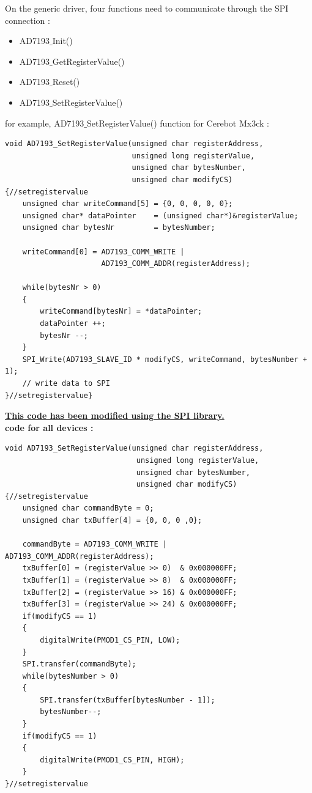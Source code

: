 \documentclass[10pt,a4paper]{report}
\begin{document}
On the generic driver, four functions need to communicate through the SPI connection :

\begin{itemize}
\item AD7193$\_$Init()
\item AD7193$\_$GetRegisterValue()
\item AD7193$\_$Reset()
\item AD7193$\_$SetRegisterValue()
\end{itemize}

 
 
for example, AD7193$\_$SetRegisterValue() function for Cerebot Mx3ck :




\begin{lstlisting}
void AD7193_SetRegisterValue(unsigned char registerAddress,
                             unsigned long registerValue,
                             unsigned char bytesNumber,
                             unsigned char modifyCS)
{//setregistervalue
    unsigned char writeCommand[5] = {0, 0, 0, 0, 0};
    unsigned char* dataPointer    = (unsigned char*)&registerValue;
    unsigned char bytesNr         = bytesNumber;

    writeCommand[0] = AD7193_COMM_WRITE |
                      AD7193_COMM_ADDR(registerAddress);
                   
    while(bytesNr > 0)
    {
        writeCommand[bytesNr] = *dataPointer;
        dataPointer ++;
        bytesNr --;
    }
    SPI_Write(AD7193_SLAVE_ID * modifyCS, writeCommand, bytesNumber + 1);
    // write data to SPI
}//setregistervalue}
\end{lstlisting}



\underline{\textbf{This code has been modified using the SPI library.}}\\

\textbf{code for all devices :} \\
\begin{lstlisting}
void AD7193_SetRegisterValue(unsigned char registerAddress,
                              unsigned long registerValue,
                              unsigned char bytesNumber,
                              unsigned char modifyCS)
{//setregistervalue
    unsigned char commandByte = 0;
    unsigned char txBuffer[4] = {0, 0, 0 ,0};
    
    commandByte = AD7193_COMM_WRITE | AD7193_COMM_ADDR(registerAddress);
	txBuffer[0] = (registerValue >> 0)  & 0x000000FF;
	txBuffer[1] = (registerValue >> 8)  & 0x000000FF;
	txBuffer[2] = (registerValue >> 16) & 0x000000FF;
	txBuffer[3] = (registerValue >> 24) & 0x000000FF;
	if(modifyCS == 1)
	{
		digitalWrite(PMOD1_CS_PIN, LOW);
	}
	SPI.transfer(commandByte);
    while(bytesNumber > 0)
    {
        SPI.transfer(txBuffer[bytesNumber - 1]);
        bytesNumber--;
    }
	if(modifyCS == 1)
	{
		digitalWrite(PMOD1_CS_PIN, HIGH);
	}
}//setregistervalue
\end{lstlisting}
\end{document}
